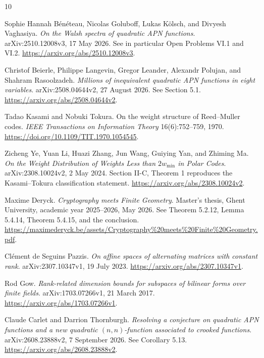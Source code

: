 \begin{thebibliography}{10}

Sophie Hannah B\'en\'eteau, Nicolas Goluboff, Lukas K\"olsch, and Divyesh Vaghasiya.
\emph{On the Walsh spectra of quadratic APN functions}.
arXiv:2510.12008v3, 17 May 2026. See in particular Open Problems VI.1 and VI.2.
\url{https://arxiv.org/abs/2510.12008v3}.

Christof Beierle, Philippe Langevin, Gregor Leander, Alexandr Polujan, and Shahram Rasoolzadeh.
\emph{Millions of inequivalent quadratic APN functions in eight variables}.
arXiv:2508.04644v2, 27 August 2026. See Section 5.1.
\url{https://arxiv.org/abs/2508.04644v2}.

Tadao Kasami and Nobuki Tokura.
On the weight structure of Reed--Muller codes.
\emph{IEEE Transactions on Information Theory} 16(6):752--759, 1970.
\url{https://doi.org/10.1109/TIT.1970.1054545}.

Zicheng Ye, Yuan Li, Huazi Zhang, Jun Wang, Guiying Yan, and Zhiming Ma.
\emph{On the Weight Distribution of Weights Less than $2w_{\min}$ in Polar Codes}.
arXiv:2308.10024v2, 2 May 2024. Section II-C, Theorem 1 reproduces the Kasami--Tokura classification statement.
\url{https://arxiv.org/abs/2308.10024v2}.

Maxime Deryck.
\emph{Cryptography meets Finite Geometry}.
Master's thesis, Ghent University, academic year 2025--2026, May 2026.
See Theorem 5.2.12, Lemma 5.4.14, Theorem 5.4.15, and the conclusion.
\url{https://maximederyck.be/assets/Cryptography%20meets%20Finite%20Geometry.pdf}.

Cl\'ement de Seguins Pazzis.
\emph{On affine spaces of alternating matrices with constant rank}.
arXiv:2307.10347v1, 19 July 2023.
\url{https://arxiv.org/abs/2307.10347v1}.

Rod Gow.
\emph{Rank-related dimension bounds for subspaces of bilinear forms over finite fields}.
arXiv:1703.07266v1, 21 March 2017.
\url{https://arxiv.org/abs/1703.07266v1}.

Claude Carlet and Darrion Thornburgh.
\emph{Resolving a conjecture on quadratic APN functions and a new quadratic $(n,n)$-function associated to crooked functions}.
arXiv:2608.23888v2, 7 September 2026. See Corollary 5.13.
\url{https://arxiv.org/abs/2608.23888v2}.

\end{thebibliography}
